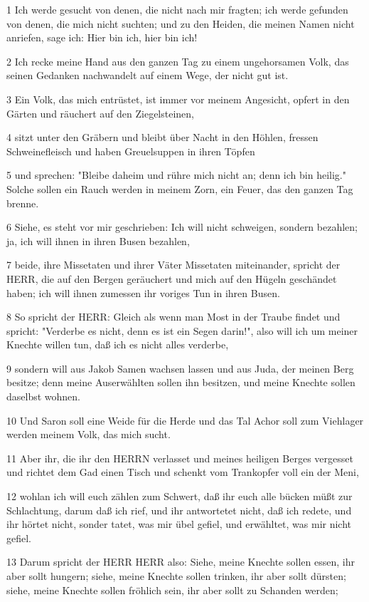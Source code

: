 \par 1 Ich werde gesucht von denen, die nicht nach mir fragten; ich werde gefunden von denen, die mich nicht suchten; und zu den Heiden, die meinen Namen nicht anriefen, sage ich: Hier bin ich, hier bin ich!
\par 2 Ich recke meine Hand aus den ganzen Tag zu einem ungehorsamen Volk, das seinen Gedanken nachwandelt auf einem Wege, der nicht gut ist.
\par 3 Ein Volk, das mich entrüstet, ist immer vor meinem Angesicht, opfert in den Gärten und räuchert auf den Ziegelsteinen,
\par 4 sitzt unter den Gräbern und bleibt über Nacht in den Höhlen, fressen Schweinefleisch und haben Greuelsuppen in ihren Töpfen
\par 5 und sprechen: "Bleibe daheim und rühre mich nicht an; denn ich bin heilig." Solche sollen ein Rauch werden in meinem Zorn, ein Feuer, das den ganzen Tag brenne.
\par 6 Siehe, es steht vor mir geschrieben: Ich will nicht schweigen, sondern bezahlen; ja, ich will ihnen in ihren Busen bezahlen,
\par 7 beide, ihre Missetaten und ihrer Väter Missetaten miteinander, spricht der HERR, die auf den Bergen geräuchert und mich auf den Hügeln geschändet haben; ich will ihnen zumessen ihr voriges Tun in ihren Busen.
\par 8 So spricht der HERR: Gleich als wenn man Most in der Traube findet und spricht: "Verderbe es nicht, denn es ist ein Segen darin!", also will ich um meiner Knechte willen tun, daß ich es nicht alles verderbe,
\par 9 sondern will aus Jakob Samen wachsen lassen und aus Juda, der meinen Berg besitze; denn meine Auserwählten sollen ihn besitzen, und meine Knechte sollen daselbst wohnen.
\par 10 Und Saron soll eine Weide für die Herde und das Tal Achor soll zum Viehlager werden meinem Volk, das mich sucht.
\par 11 Aber ihr, die ihr den HERRN verlasset und meines heiligen Berges vergesset und richtet dem Gad einen Tisch und schenkt vom Trankopfer voll ein der Meni,
\par 12 wohlan ich will euch zählen zum Schwert, daß ihr euch alle bücken müßt zur Schlachtung, darum daß ich rief, und ihr antwortetet nicht, daß ich redete, und ihr hörtet nicht, sonder tatet, was mir übel gefiel, und erwähltet, was mir nicht gefiel.
\par 13 Darum spricht der HERR HERR also: Siehe, meine Knechte sollen essen, ihr aber sollt hungern; siehe, meine Knechte sollen trinken, ihr aber sollt dürsten; siehe, meine Knechte sollen fröhlich sein, ihr aber sollt zu Schanden werden;
